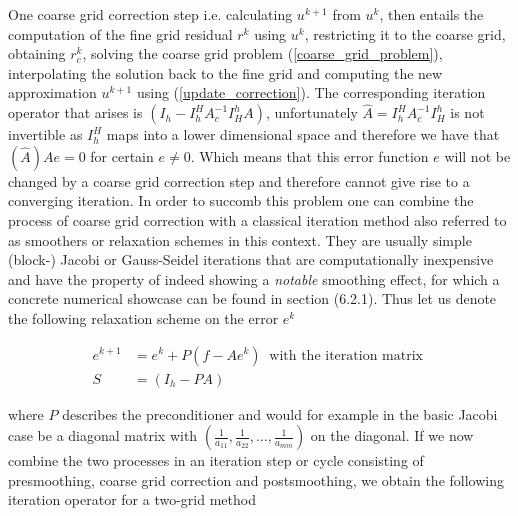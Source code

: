 \documentclass[../draft_1.tex]{subfiles}
\begin{document}
One coarse grid correction step i.e. calculating $u^{k+1}$ from $u^k$, then entails the computation of the fine grid residual $r^k$ using $u^k$, restricting it to the coarse grid, obtaining $r_c^k$, solving the coarse grid problem (\ref{coarse_grid_problem}), interpolating the solution back to the fine grid and computing the new approximation $u^{k+1}$ using (\ref{update_correction}). The corresponding iteration operator that arises is $(I_h - I_h^H A_c^{-1} I_H^h A) $, unfortunately $\hat{A} = I_h^H A_c^{-1} I_H^h $ is not invertible as $I_h^H$ maps into a lower dimensional space and therefore we have that $(\hat{A}) A e = 0$ for certain $e \neq 0$. Which means that this error function $e$ will not be changed by a coarse grid correction step and therefore cannot give rise to a converging iteration. In order to succomb this problem one can combine the process of coarse grid correction with a classical iteration method also referred to as smoothers or relaxation schemes in this context. They are usually simple (block-) Jacobi or Gauss-Seidel iterations that are computationally inexpensive and have the property of indeed showing a \textit{notable} smoothing effect, for which a concrete numerical showcase can be found in section (6.2.1). Thus let us denote the following relaxation scheme on the error $e^k$ 
\begin{ceqn}
	\begin{align}
e^{k+1} &= e^k + P(f - Ae^k) \ \text{ with the iteration matrix } \\
S &= (I_h - PA)
	\end{align}
\end{ceqn}
where $P$ describes the preconditioner and would for example in the basic Jacobi case be a diagonal matrix with $(\frac{1}{a_{11}}, \frac{1}{a_{22}}, ..., \frac{1}{a_{mm}})$ on the diagonal. If we now combine the two processes in an iteration step or cycle consisting of presmoothing, coarse grid correction and postsmoothing, we obtain the following iteration operator for a two-grid method
\end{document}
